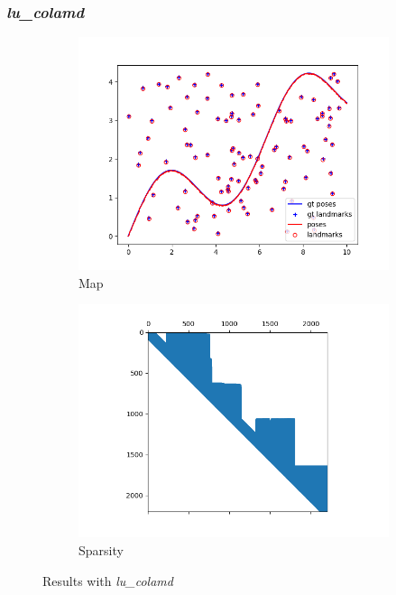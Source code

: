 \documentclass[12pt, a4paper]{article}
\begin{document}
\subsubsection{\textit{lu\_colamd}}
\begin{figure}[H]
  \centering
  \begin{subfigure}[b]{0.45\textwidth}
    \includegraphics[width=\textwidth]{./results/linear/lu_colamd_2d_linear_map.png}
    \caption{Map}
  \end{subfigure}
  \hfill
  \begin{subfigure}[b]{0.45\textwidth}
    \includegraphics[width=\textwidth]{./results/linear/lu_colamd_2d_linear_sparsity.png}
    \caption{Sparsity}
  \end{subfigure}
  \caption{Results with \textit{lu\_colamd}}
\end{figure}
\end{document}
